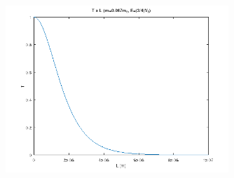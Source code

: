 \begin{figure}[H] \centering
	\includegraphics[width=0.75\textwidth]{../images/q2d.png}
	\label{fig:q2c}
\end{figure}
